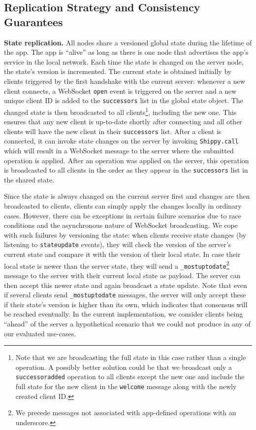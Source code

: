 \subsection{Replication Strategy and Consistency Guarantees}
\label{sub:approach_replication_strategy}

\textbf{State replication.}
All \APIshort nodes share a versioned global state during the lifetime of the app.
The app is ``alive'' as long as there is one node that advertises the app's service in the local network.
Each time the state is changed on the server node, the state's version is incremented.
The current state is obtained initially by clients triggered by the first handshake with the current server: whenever a new client connects, a WebSocket \texttt{open} event is triggered on the server and a new unique client ID is added to the \texttt{successors} list in the global state object.
The changed state is then broadcasted to all clients\footnote{Note that we are broadcasting the full state in this case rather than a single operation.
A possibly better solution could be that we broadcast only a \texttt{successoradded} operation to all clients except the new one and include the full state for the new client in the \texttt{welcome} message along with the newly created client ID.}, including the new one.
This ensures that any new client is up-to-date shortly after connecting and all other clients will have the new client in their \texttt{successors} list.
After a client is connected, it can invoke state changes on the server by invoking \texttt{Shippy.call} which will result in a WebSocket message to the server where the submitted operation is applied.
After an operation was applied on the server, this operation is broadcasted to all clients in the order as they appear in the \texttt{successors} list in the shared state.

Since the state is always changed on the current server first and changes are then broadcasted to clients, clients can simply apply the changes locally in ordinary cases.
However, there can be exceptions in certain failure scenarios due to race conditions and the asynchronous nature of WebSocket broadcasting.
We cope with such failures by versioning the state: when clients receive state changes (by listening to \texttt{stateupdate} events), they will check the version of the server's current state and compare it with the version of their local state.
In case their local state is newer than the server state, they will send a \texttt{\_mostuptodate}\footnote{We precede messages not associated with app-defined operations with an underscore.} message to the server with their current local state as payload.
The server can then accept this newer state and again broadcast a state update.
Note that even if several clients send \texttt{\_mostuptodate} messages, the server will only accept these if their state's version is higher than its own, which indicates that consensus will be reached eventually.
In the current \APIshort implementation, we consider clients being ``ahead'' of the server a hypothetical scenario that we could not produce in any of our evaluated use-cases.


